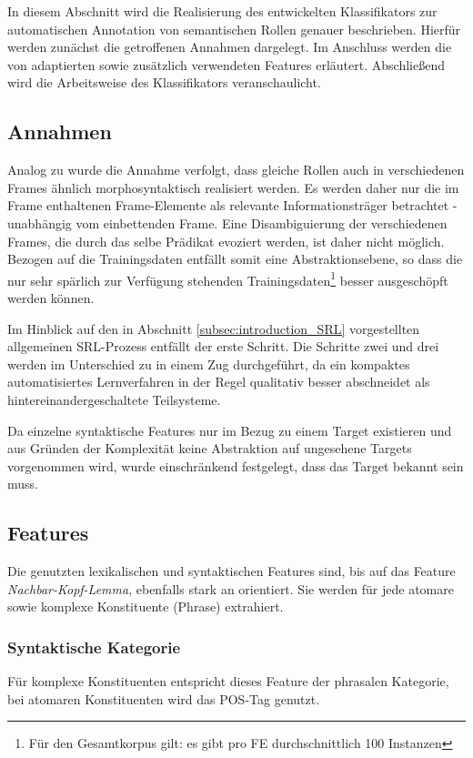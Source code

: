 \documentclass[12pt]{article}
\begin{document}
In diesem Abschnitt wird die Realisierung des entwickelten Klassifikators zur automatischen Annotation von semantischen Rollen genauer beschrieben. Hierfür werden zunächst die getroffenen Annahmen dargelegt. Im Anschluss werden die von \cite{gildea} adaptierten sowie zusätzlich verwendeten Features erläutert. Abschließend wird die Arbeitsweise des Klassifikators veranschaulicht.

\subsection{Annahmen}

Analog zu \cite{gildea} wurde die Annahme verfolgt, dass gleiche Rollen auch in verschiedenen Frames ähnlich morphosyntaktisch realisiert werden. Es werden daher nur die im Frame enthaltenen Frame-Elemente als relevante Informationsträger betrachtet - unabhängig vom einbettenden Frame. Eine Disambiguierung der verschiedenen Frames, die durch das selbe Prädikat evoziert werden, ist daher nicht möglich. Bezogen auf die Trainingsdaten entfällt somit eine Abstraktionsebene, so dass die nur sehr spärlich zur Verfügung stehenden Trainingsdaten\footnote{Für den Gesamtkorpus gilt: es gibt pro FE durchschnittlich 100 Instanzen} besser ausgeschöpft werden können.

Im Hinblick auf den in Abschnitt \ref{subsec:introduction_SRL} vorgestellten allgemeinen SRL-Prozess entfällt der erste Schritt. Die Schritte zwei und drei werden im Unterschied zu \cite{gildea} in einem Zug durchgeführt, da ein kompaktes automatisiertes Lernverfahren in der Regel qualitativ besser abschneidet als hintereinandergeschaltete Teilsysteme.

Da einzelne syntaktische Features nur im Bezug zu einem Target existieren und aus Gründen der Komplexität keine Abstraktion auf ungesehene Targets vorgenommen wird, wurde einschränkend festgelegt, dass das Target bekannt sein muss.

\subsection{Features}

Die genutzten lexikalischen und syntaktischen Features sind, bis auf das Feature \textit{Nachbar-Kopf-Lemma}, ebenfalls stark an \cite{gildea} orientiert. Sie werden für jede atomare sowie komplexe Konstituente (Phrase) extrahiert.

\subsubsection*{Syntaktische Kategorie}
Für komplexe Konstituenten entspricht dieses Feature der phrasalen Kategorie, bei atomaren Konstituenten wird das POS-Tag genutzt.
\end{document}
